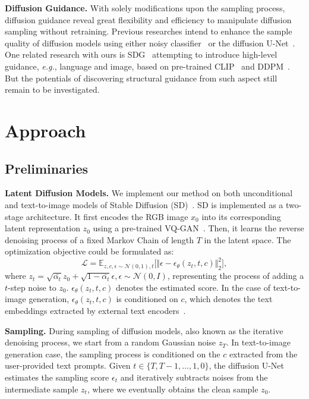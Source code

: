 \documentclass{article}
\begin{document}
\textbf{Diffusion Guidance.} With solely modifications upon the sampling process, diffusion guidance reveal great flexibility and efficiency to manipulate diffusion sampling without retraining. Previous researches intend to enhance the sample quality of diffusion models using either noisy classifier~\cite{dhariwal2021diffusion} or the diffusion U-Net~\cite{ho2022classifier}. One related research with ours is SDG~\cite{liu2023more} attempting to introduce high-level guidance, \textit{e.g.}, language and image, based on pre-trained CLIP~\cite{radford2021learning} and DDPM~\cite{nichol2021improved}. But the potentials of discovering structural guidance from such aspect still remain to be investigated.

\section{Approach}
\label{section:approach}

\subsection{Preliminaries}

\textbf{Latent Diffusion Models.} We implement our method on both unconditional and text-to-image models of Stable Diffusion (SD)~\cite{rombach2022high}. SD is implemented as a two-stage architecture. It first encodes the RGB image $x_0$ into its corresponding latent representation $z_0$ using a pre-trained VQ-GAN~\cite{esser2021taming}. Then, it learns the reverse denoising process of a fixed Markov Chain of length $T$ in the latent space. The optimization objective could be formulated as:
\begin{equation}
\mathcal{L} = \mathbb{E}_{z, c, \epsilon \sim \mathcal{N}(0, 1), t} \bigg[ \Vert \epsilon - \epsilon_\theta(z_t, t, c) \Vert^2_2 \bigg],
\end{equation}
where $z_t = \sqrt{\bar{\alpha_t}} z_0 + \sqrt{1 - \bar{\alpha_{t}}} \epsilon, \epsilon \sim \mathcal{N}(0, I)$, representing the process of adding a $t$-step noise to $z_0$. $\epsilon_\theta (z_t, t, c)$ denotes the estimated score. In the case of text-to-image generation, $\epsilon_\theta (z_t, t, c)$ is conditioned on $c$, which denotes the text embeddings extracted by external text encoders~\cite{radford2021learning, cherti2022reproducible}.

\textbf{Sampling.} During sampling of diffusion models, also known as the iterative denoising process, we start from a random Gaussian noise $z_T$. In text-to-image generation case, the sampling process is conditioned on the $c$ extracted from the user-provided text prompts. Given $t \in \{ T, T-1, \dots, 1, 0 \}$, the diffusion U-Net estimates the sampling score $\epsilon_t$ and iteratively subtracts noises from the intermediate sample $z_t$, where we eventually obtains the clean sample $z_0$.
\end{document}
